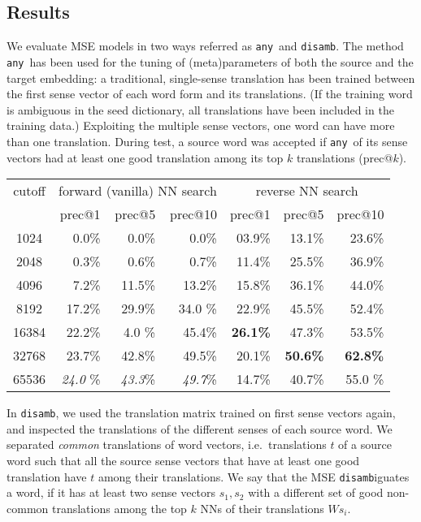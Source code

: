 \documentclass[11pt]{article}
\begin{document}
\subsection{Results}

\newcommand{\any}{\texttt{any}}
\newcommand{\disamb}{\texttt{disamb}}

We evaluate MSE models in two ways referred as \any~and \disamb.
The method \any~has been used for the tuning of (meta)parameters of
both the source and the target embedding: a traditional, single-sense
translation has been trained between the first sense vector of each word form and
its translations. (If the training word is ambiguous in the seed dictionary,
all translations have been included in the training data.)  Exploiting the
multiple sense vectors, one word can have more than one translation.  During
test, a source word was accepted if \any~of its sense vectors had at least one
good translation among its top $k$ translations (prec@$k$).

\begin{table*} \centering
  \begin{tabular}{c|rrr|rrr}
    \toprule
    cutoff &
    \multicolumn{3}{c|}{forward (vanilla) NN search} &
    \multicolumn{3}{c}{reverse NN search} \\
    & prec@1 & prec@5 & prec@10 & prec@1 & prec@5 & prec@10 \\
    \midrule
    1024 & 0.0\% & 0.0\% & 0.0\% & 03.9\% & 13.1\% & 23.6\% \\
    2048 & 0.3\% & 0.6\% & 0.7\% & 11.4\% & 25.5\% & 36.9\% \\
    4096 & 7.2\% & 11.5\% & 13.2\% & 15.8\% & 36.1\% & 44.0\% \\
    8192 & 17.2\% & 29.9\% & 34.0 \%& 22.9\% & 45.5\% & 52.4\% \\
    16384 & 22.2\% & 4.0 \% & 45.4\% & \textbf{26.1\%} & 47.3\% & 53.5\% \\
    32768 & 23.7\% & 42.8\% & 49.5\% & 20.1\% & \textbf{50.6\%} & \textbf{62.8\%} \\
    65536 & \emph{24.0} \%& \emph{43.3}\% & \emph{49.7}\% & 14.7\% & 40.7\% & 55.0 \%\\
    \bottomrule
  \end{tabular}
  \caption{Precision of \any~reverse NN when translating from an AdaGram model
  trained on HNC (600 dimensions, $\alpha=.05$)}
  \label{tab:prec}
\end{table*}

In \disamb, we used the translation matrix trained on first sense vectors again,
and inspected the translations of the different senses of each source word.
We separated \emph{common} translations of word vectors, i.e.~translations $t$ of a source word
such that all the source sense vectors that have at least one good
translation have $t$ among their translations. We say that the MSE
\disamb iguates a word, if it has at least two sense vectors $s_1, s_2$ with a
different set of good non-common translations among the top $k$ NNs of their
translations $Ws_i$.
\end{document}
